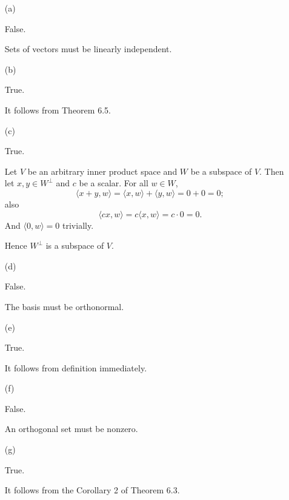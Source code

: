 \begin{Exercise}
	\begin{enumerate}[(a)]
		\item[(a)]
		\begin{answer}
			False.
		\end{answer}
		\begin{solution}
			Sets of vectors must be linearly independent.
		\end{solution}
		
		\item[(b)]
		\begin{answer}
			True.
		\end{answer}
		\begin{solution}
			It follows from Theorem 6.5.
		\end{solution}
		
		\item[(c)]
		\begin{answer}
			True.
		\end{answer}
		\begin{solution}
			Let $V$ be an arbitrary inner product space and $W$ be a subspace of $V$. Then let $x,y\in W^{\perp}$ and $c$ be a scalar. For all $w\in W$,
			$$
			\langle x+y, w \rangle = \langle x,w \rangle + \langle y,w \rangle = 0 + 0 = 0;
			$$
			also
			$$
			\langle c x, w \rangle = c \langle x,w \rangle = c\cdot 0 = 0.
			$$
			And $\langle 0, w \rangle = 0$ trivially.
			
			Hence $W^{\perp}$ is a subspace of $V$.
		\end{solution}
		
		\item[(d)]
		\begin{answer}
			False.
		\end{answer}
		\begin{solution}
			The basis must be orthonormal.
		\end{solution}
		
		\item[(e)]
		\begin{answer}
			True.
		\end{answer}
		\begin{solution}
			It follows from definition immediately.
		\end{solution}
		
		\item[(f)]
		\begin{answer}
			False.
		\end{answer}
		\begin{solution}
			An orthogonal set must be nonzero.
		\end{solution}
		
		\item[(g)]
		\begin{answer}
			True.
		\end{answer}
		\begin{solution}
			It follows from the Corollary 2 of Theorem 6.3.
		\end{solution}
		
	\end{enumerate}
\end{Exercise}